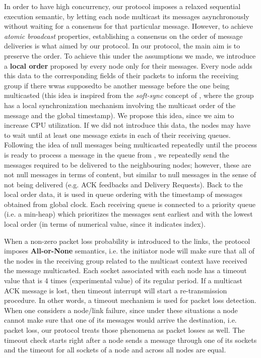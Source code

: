 \documentclass[a4paper, 12pt]{article}
\begin{document}
In order to have high concurrency, our protocol imposes a relaxed sequential execution semantic, by letting each node multicast its messages asynchronously without waiting for a consensus for that particular message. However, to achieve \textit{atomic broadcast} properties, establishing a consensus on the order of message deliveries is what aimed by our protocol. In our protocol, the main aim is to preserve the order. To achieve this under the assumptions we made, we introduce a \textbf{local order} proposed by every node only for their messages. Every node adds this data to the corresponding fields of their packets to inform the receiving group if there wwas supposedto be another message before the one being multicasted (this idea is inspired from the \textit{soft-sync} concept of \cite{FastCast}, where the group has a local synchronization mechanism involving the multicast order of the message and the global timestamp). We propose this idea, since we aim to increase CPU utilization. If we did not introduce this data, the nodes may have to wait until at least one message exists in each of their receiving queues. Following the idea of null messages being multicasted repeatedly until the process is ready to process a message in the queue from \cite{CMB}, we repeatedly send the messages required to be delivered to the neighbouring nodes; however, these are not null messages in terms of content, but similar to null messages in the sense of not being delivered (e.g. ACK feedbacks and Delivery Requests). Back to the local order data, it is used in queue ordering with the timestamp of messages obtained from global clock. Each receiving queue is connected to a priority queue (i.e. a min-heap) which prioritizes the messages sent earliest and with the lowest local order (in terms of numerical value, since it indicates index).

When a non-zero packet loss probability is introduced to the links, the protocol imposes \textbf{All-or-None} semantics, i.e. the initiator node will make sure that all of the nodes in the receiving group related to the multicast context have received the message multicasted. Each socket associated with each node has a timeout value that is 4 times (experimental value) of its regular period. If a multicast ACK message is lost, then timeout interrupt will start a re-transmission procedure. In other words, a timeout mechanism is used for packet loss detection. When one considers a node/link failure, since under these situations a node cannot make sure that one of its messages would arrive the destination, i.e. packet loss, our protocol treats those phenomena as packet losses as well. The timeout check starts right after a node sends a message through one of its sockets and the timeout for all sockets of a node and across all nodes are equal.
\end{document}
